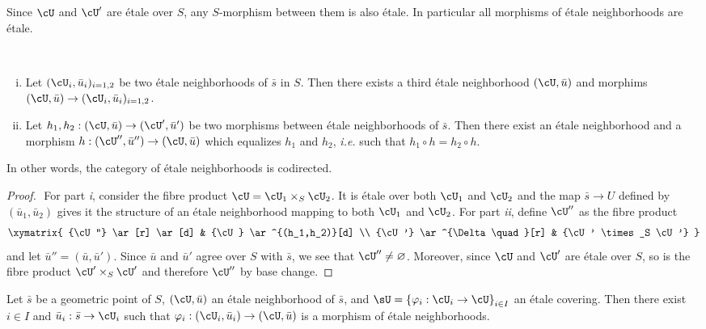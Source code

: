 \begin{remark}
Since $\cU$ and $\cU'$ are \'etale over $S$, any $S$-morphism between them is also \'etale. In particular all morphisms of \'etale neighborhoods are \'etale.
\end{remark}

\begin{lem} $ $ \label{lem:CofinalityOfEtaleNbhds}
\begin{enumerate}[i.]
\item Let $(\cU_i, \bar u_i)_{i=1, 2}$ be two \'etale neighborhoods of $\bar s$ in $S$. Then there exists a third \'etale neighborhood $(\cU, \bar u)$ and morphims $(\cU, \bar u) \to (\cU_i, \bar u_i)_{i=1,2}$.
\item Let $h_1, h_2: (\cU, \bar u) \to (\cU', \bar u')$ be two morphisms between \'etale neighborhoods of $\bar s$. Then there exist an \'etale neighborhood and a morphism $h : (\cU'', \bar u'')\to (\cU, \bar u)$ which equalizes $h_1$ and $h_2$, {\it i.e.}  such that $h_1\circ h = h_2\circ h$.		
\end{enumerate}
\end{lem}

In other words, the category of \'etale neighborhoods is codirected.

\begin{proof} $ $
For part {\it i}, consider the fibre product $\cU = \cU_1 \times_S \cU_2$. It is \'etale over both $\cU_1$ and $\cU_2$ and the map $\bar s \to U$ defined by $(\bar u_1, \bar u_2)$ gives it the structure of an \'etale neighborhood mapping to both $\cU_1$ and $\cU_2$. For part {\it ii}, define $\cU''$ as the fibre product 
$$
\xymatrix{
{\cU''} \ar[r] \ar[d] & {\cU} \ar^{(h_1,h_2)}[d] \\
{\cU'} \ar^{\Delta \quad}[r] & {\cU' \times_S \cU'}
}
$$
and let $\bar u'' = (\bar u, \bar u')$. Since $\bar u$ and $\bar u'$ agree over $S$ with $\bar s$, we see that $\cU''\neq\varnothing$. Moreover, since $\cU$ and $\cU'$ are \'etale over $S$, so is the fibre product $\cU'\times_S \cU'$ and therefore $\cU''$ by base change.
\end{proof}

\begin{lem} \label{lem:geomPointsAreInSomeOpen}
Let $\bar s$ be a geometric point of $S$, $(\cU, \bar u)$ an \'etale neighborhood of $\bar s$, and $\sU = \left\{\varphi_i : \cU_i \to \cU \right\}_{i\in I}$ an \'etale covering. Then there exist $i\in I$ and $\bar u_i: \bar s  \to \cU_i$ such that $\varphi_i: (\cU_i, \bar u_i) \to (\cU, \bar u)$ is a morphism of \'etale neighborhoods.  
\end{lem}

